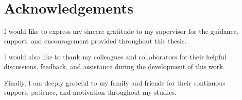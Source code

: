 \chapter*{Acknowledgements}

I would like to express my sincere gratitude to my supervisor for the guidance, support, and encouragement provided throughout this thesis.

I would also like to thank my colleagues and collaborators for their helpful discussions, feedback, and assistance during the development of this work.

Finally, I am deeply grateful to my family and friends for their continuous support, patience, and motivation throughout my studies.